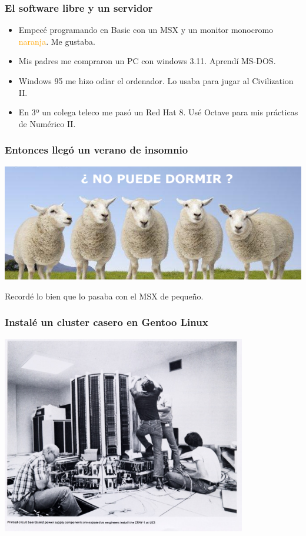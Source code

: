 \documentclass[12pt,mathserif,compress]{beamer}
\begin{document}
\begin{frame}
\frametitle{El software libre y un servidor}
\begin{itemize}
\item Empecé programando en Basic con un MSX y un monitor monocromo
  \textcolor{orange}{naranja}. Me gustaba.
\pause
\item Mis padres me compraron un PC con windows 3.11. Aprendí
  MS-DOS.
\pause
\item Windows 95 me hizo odiar el ordenador. Lo usaba para jugar al
  Civilization II.
\pause
\item En 3º un colega teleco me pasó un Red Hat 8.  Usé Octave para
  mis prácticas de Numérico II.
\end{itemize}
\end{frame}

\begin{frame}
\frametitle{Entonces llegó un verano de insomnio}
\begin{center}
 \includegraphics[width=\textwidth]{files/insomnio-ovejas.png}\\
\end{center}
\end{frame}

\begin{frame}
  \begin{center}
    Recordé lo bien que lo pasaba con el MSX de pequeño.
  \end{center}
\end{frame}

\begin{frame}
  \frametitle{Instalé un cluster casero en Gentoo Linux}
  \begin{center}
 \includegraphics[width=0.8\textwidth]{files/ucs_Cray1_install.jpg}    
  \end{center}
\end{frame}
\end{document}
